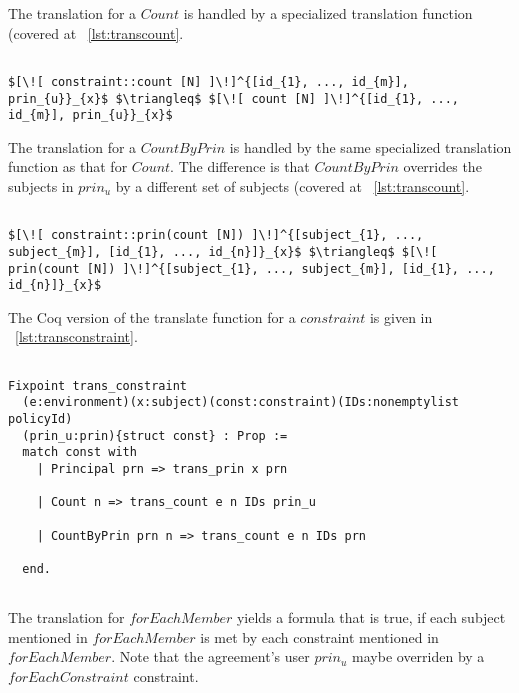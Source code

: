 The translation for a $Count$ is handled by a specialized translation function (covered at ~\ref{lst:transcount}.

\lstset{mathescape, language=AST}  
\begin{lstlisting}[frame=single, caption={Constraint Translation {$\colon$} Count},label={lst:transconstraintCount}]

$[\![ constraint::count [N] ]\!]^{[id_{1}, ..., id_{m}], prin_{u}}_{x}$ $\triangleq$ $[\![ count [N] ]\!]^{[id_{1}, ..., id_{m}], prin_{u}}_{x}$ 
\end{lstlisting}

The translation for a $CountByPrin$ is handled by the same specialized translation function as that for $Count$. The difference is that $CountByPrin$ overrides the subjects in $prin_{u}$ by a different set of subjects (covered at ~\ref{lst:transcount}.

\lstset{mathescape, language=AST}  
\begin{lstlisting}[frame=single, caption={Constraint Translation {$\colon$} Count by Principal},label={lst:transconstraintCountbyPrin}]

$[\![ constraint::prin(count [N]) ]\!]^{[subject_{1}, ..., subject_{m}], [id_{1}, ..., id_{n}]}_{x}$ $\triangleq$ $[\![ prin(count [N]) ]\!]^{[subject_{1}, ..., subject_{m}], [id_{1}, ..., id_{n}]}_{x}$ 
\end{lstlisting}

The Coq version of the translate function for a $constraint$ is given in ~\ref{lst:transconstraint}. 

\begin{lstlisting}

Fixpoint trans_constraint 
  (e:environment)(x:subject)(const:constraint)(IDs:nonemptylist policyId)
  (prin_u:prin){struct const} : Prop := 
  match const with
    | Principal prn => trans_prin x prn
  
    | Count n => trans_count e n IDs prin_u 

    | CountByPrin prn n => trans_count e n IDs prn 

  end.
  
\end{lstlisting}


The translation for $forEachMember$ yields a formula that is true, if each subject mentioned in $forEachMember$ is met by each constraint mentioned in $forEachMember$. Note that the agreement's user $prin_{u}$ maybe overriden by a $forEachConstraint$ constraint. 


